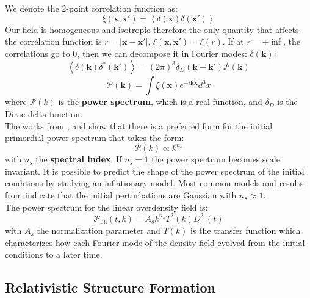 We denote the 2-point correlation function as:
\begin{equation}
    \xi(\mathbf{x}, \mathbf{x}') = \left\langle \delta(\mathbf{x}) \delta(\mathbf{x}') \right\rangle
\end{equation}
Our field is homogeneous and isotropic therefore the only 
quantity that affects the correlation function is $r=|\mathbf{x} - \mathbf{x}'|$, $\xi(\mathbf{x}, \mathbf{x}')=\xi(r)$. If at $r=+\inf$, the correlations go to 0, 
then we can decompose it in Fourier modes:
$\delta(\mathbf{k})$:
\begin{equation}
    \left\langle \delta(\mathbf{k}) \delta^*(\mathbf{k}') \right\rangle = (2 \pi)^3 \delta_D(\mathbf{k} - \mathbf{k}')\mathcal{P}(\mathbf{k})
\end{equation}
\begin{equation}
    \mathcal{P}(\mathbf{k}) = \int \xi(\mathbf{x})e^{-i \mathbf{k} \mathbf{x}} d^3x
\end{equation}
where $\mathcal{P}(k)$ is the \textbf{power spectrum}, which is a real function, and $\delta_D$ is the Dirac delta function. \\
The works from \cite{Harrison_1970}, \cite{Zeldovich_1970_pk} and \cite{Peebles_1970} show that there is a preferred form for the initial primordial power spectrum that takes the form:
\begin{equation}
    \mathcal{P}(k) \propto k^{n_s}
\end{equation}
with $n_s$ the \textbf{spectral index}. If $n_s=1$ the power spectrum becomes scale invariant. It is possible to predict the shape of the power spectrum of the initial conditions by studying an inflationary model. Most common models 
and results from \cite{Planck_2018} indicate that the initial perturbations are Gaussian with $n_s \approx 1 $. \\
The power spectrum for the linear overdensity field is:
\begin{equation}
    \mathcal{P}_{\text{lin}}(t, k) = A_s k^{n_s}T^2(k)D^2_+(t)
\end{equation} \label{eqn:pk_lin}
with $A_s$ the normalization parameter and $T(k)$ is the transfer function which characterizes how each Fourier mode of the density field evolved from the initial conditions to 
a later time. \\


\subsection{Relativistic Structure Formation}


